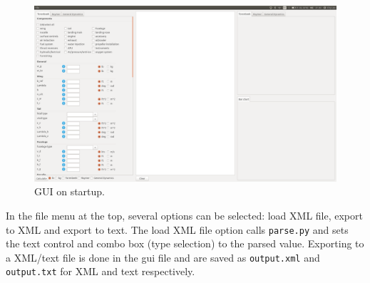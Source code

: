 \begin{figure}[ht]
\centering
\includegraphics[width=1\textwidth]{image/gui_startup.png}
\caption{GUI on startup.}
\label{fig:gui1}
\end{figure}

In the file menu at the top, several options can be selected: load XML file, export to XML and export to text.
The load XML file option calls \texttt{parse.py} and sets the text control and combo box (type selection) to the parsed value.
Exporting to a XML/text file is done in the gui file and are saved as \texttt{output.xml} and \texttt{output.txt} for XML and text respectively.


